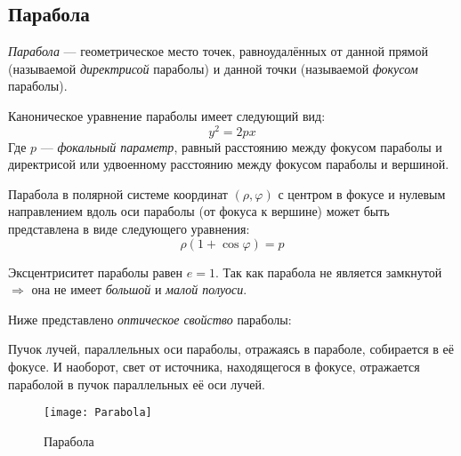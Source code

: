 \subsection{Парабола}

\textsl{Парабола} --- геометрическое место точек, равноудалённых от данной прямой (называемой \textit{директрисой} параболы) и данной точки (называемой \textit{фокусом} параболы).

Каноническое уравнение параболы имеет следующий вид:
\begin{equation}
y^2=2px
\end{equation}
Где $p$ --- \textit{фокальный параметр}, равный расстоянию между фокусом параболы и директрисой или удвоенному расстоянию между фокусом параболы и вершиной.

Парабола в полярной системе координат $(\rho,\varphi)$ с центром в фокусе и нулевым направлением вдоль оси параболы (от фокуса к вершине) может быть представлена в виде следующего уравнения:
\begin{equation}
\rho(1+\cos\varphi)=p
\end{equation}

Эксцентриситет параболы равен $e=1$.
Так как парабола не является замкнутой $\Rightarrow$ она не имеет \textit{большой} и \textit{малой полуоси}.

Ниже представлено \textit{оптическое свойство} параболы:

Пучок лучей, параллельных оси параболы, отражаясь в параболе, собирается в её фокусе. И наоборот, свет от источника, находящегося в фокусе, отражается параболой в пучок параллельных её оси лучей.
\begin{figure}[h!]
\centering
\texttt{[image: Parabola]}
\caption{Парабола \label{pic:the-pic}}
\end{figure}
